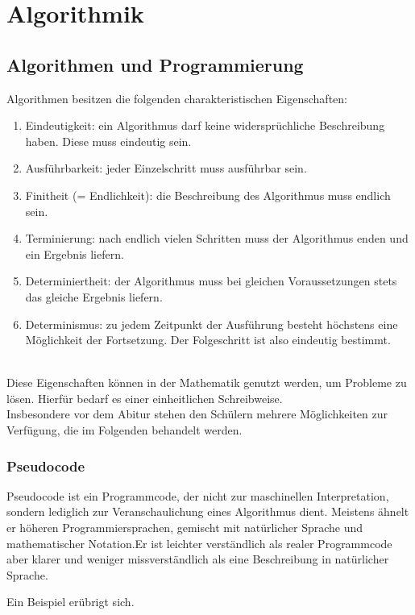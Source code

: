 \chapter{Algorithmik}
\section{Algorithmen und Programmierung}
\begin{Definition}
	Algorithmen besitzen die folgenden charakteristischen Eigenschaften:
	\begin{enumerate}
		\item Eindeutigkeit: ein Algorithmus darf keine widersprüchliche Beschreibung haben. Diese muss eindeutig sein.
		\item Ausführbarkeit: jeder Einzelschritt muss ausführbar sein.
		\item Finitheit (= Endlichkeit): die Beschreibung des Algorithmus muss endlich sein.
		\item Terminierung: nach endlich vielen Schritten muss der Algorithmus enden und ein Ergebnis liefern.
		\item Determiniertheit: der Algorithmus muss bei gleichen Voraussetzungen stets das gleiche Ergebnis liefern.
		\item   Determinismus: zu jedem Zeitpunkt der Ausführung besteht höchstens eine Möglichkeit der Fortsetzung. Der Folgeschritt ist also eindeutig bestimmt.
	\end{enumerate}
\end{Definition}
\\
Diese Eigenschaften können in der Mathematik genutzt werden, um Probleme zu lösen. Hierfür bedarf es einer einheitlichen Schreibweise.\\
Insbesondere vor dem Abitur stehen den Schülern mehrere Möglichkeiten zur Verfügung, die im Folgenden behandelt werden.
\subsection{Pseudocode}
Pseudocode ist ein Programmcode, der nicht zur maschinellen Interpretation, sondern lediglich zur Veranschaulichung eines Algorithmus dient. Meistens ähnelt er höheren Programmiersprachen, gemischt mit natürlicher Sprache und mathematischer Notation.Er ist leichter verständlich als realer Programmcode aber klarer und weniger missverständlich als eine Beschreibung in natürlicher Sprache.
\begin{Beispiel}
	Ein Beispiel erübrigt sich.
\end{Beispiel}
